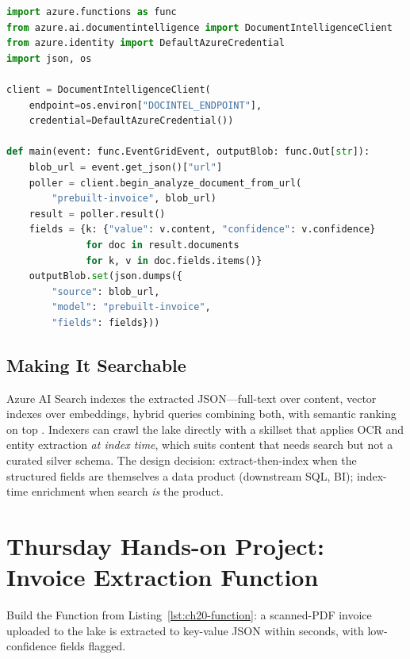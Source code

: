\begin{lstlisting}[language=Python,caption={Event Grid-triggered Function extracting an invoice and landing JSON in the lake.},label={lst:ch20-function}]
import azure.functions as func
from azure.ai.documentintelligence import DocumentIntelligenceClient
from azure.identity import DefaultAzureCredential
import json, os

client = DocumentIntelligenceClient(
    endpoint=os.environ["DOCINTEL_ENDPOINT"],
    credential=DefaultAzureCredential())

def main(event: func.EventGridEvent, outputBlob: func.Out[str]):
    blob_url = event.get_json()["url"]
    poller = client.begin_analyze_document_from_url(
        "prebuilt-invoice", blob_url)
    result = poller.result()
    fields = {k: {"value": v.content, "confidence": v.confidence}
              for doc in result.documents
              for k, v in doc.fields.items()}
    outputBlob.set(json.dumps({
        "source": blob_url,
        "model": "prebuilt-invoice",
        "fields": fields}))
\end{lstlisting}

\subsection{Making It Searchable}
Azure AI Search indexes the extracted JSON---full-text over content, vector indexes over embeddings, hybrid queries combining both, with semantic ranking on top \cite{microsoft2025cognitiveSearch}. Indexers can crawl the lake directly with a skillset that applies OCR and entity extraction \emph{at index time}, which suits content that needs search but not a curated silver schema. The design decision: extract-then-index when the structured fields are themselves a data product (downstream SQL, BI); index-time enrichment when search \emph{is} the product.

\section{Thursday Hands-on Project: Invoice Extraction Function}
Build the Function from Listing~\ref{lst:ch20-function}: a scanned-PDF invoice uploaded to the lake is extracted to key-value JSON within seconds, with low-confidence fields flagged.

